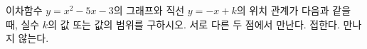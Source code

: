 이차함수 $y=x^2-5x-3$의 그래프와 직선 $y=-x+k$의 위치 관계가 다음과 같을 때, 실수 $k$의 값 또는 값의 범위를 구하시오.
 서로 다른 두 점에서 만난다.
 접한다.
 만나지 않는다.
